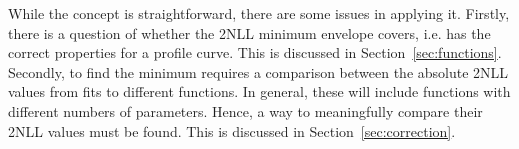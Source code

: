 While the concept is straightforward, there are some issues in applying it.
Firstly, there is a question of whether the 2NLL minimum envelope covers,
i.e. has the correct properties for a profile curve.
This is discussed in Section~\ref{sec:functions}.
Secondly, to find the minimum requires a
comparison between the absolute 2NLL values from fits to different functions.
In general, these will include functions with different numbers of parameters.
Hence, a way to meaningfully compare their 2NLL values must be found.
This is discussed in Section~\ref{sec:correction}.
